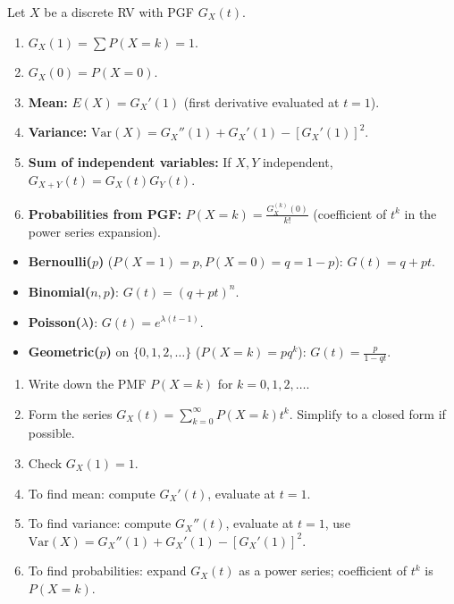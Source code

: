 \documentclass[11pt]{article}
\begin{document}
\begin{propriete}
Let $X$ be a discrete RV with PGF $G_X(t)$.
\begin{enumerate}
\item $G_X(1) = \sum P(X=k) = 1$.
\item $G_X(0) = P(X=0)$.
\item \textbf{Mean:} $E(X) = G_X'(1)$ (first derivative evaluated at $t=1$).
\item \textbf{Variance:} $\text{Var}(X) = G_X''(1) + G_X'(1) - [G_X'(1)]^2$.
\item \textbf{Sum of independent variables:} If $X,Y$ independent, $G_{X+Y}(t) = G_X(t)G_Y(t)$.
\item \textbf{Probabilities from PGF:} $P(X=k) = \frac{G_X^{(k)}(0)}{k!}$ (coefficient of $t^k$ in the power series expansion).
\end{enumerate}
\end{propriete}

\begin{aretenir}
\begin{itemize}
\item \textbf{Bernoulli($p$)} ($P(X=1)=p, P(X=0)=q=1-p$): $G(t)=q+pt$.
\item \textbf{Binomial($n,p$)}: $G(t)=(q+pt)^n$.
\item \textbf{Poisson($\lambda$)}: $G(t)=e^{\lambda(t-1)}$.
\item \textbf{Geometric($p$)} on $\{0,1,2,\dots\}$ ($P(X=k)=pq^k$): $G(t)=\frac{p}{1-qt}$.
\end{itemize}
\end{aretenir}

\begin{methode}
\begin{enumerate}
\item Write down the PMF $P(X=k)$ for $k=0,1,2,\dots$.
\item Form the series $G_X(t) = \sum_{k=0}^\infty P(X=k)t^k$. Simplify to a closed form if possible.
\item Check $G_X(1)=1$.
\item To find mean: compute $G_X'(t)$, evaluate at $t=1$.
\item To find variance: compute $G_X''(t)$, evaluate at $t=1$, use $\text{Var}(X)=G_X''(1)+G_X'(1)-[G_X'(1)]^2$.
\item To find probabilities: expand $G_X(t)$ as a power series; coefficient of $t^k$ is $P(X=k)$.
\end{enumerate}
\end{methode}
\end{document}
